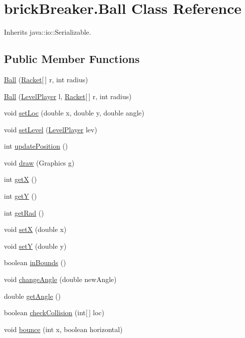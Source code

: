 \hypertarget{classbrick_breaker_1_1_ball}{
\section{brickBreaker.Ball Class Reference}
\label{classbrick_breaker_1_1_ball}
}


Inherits java::io::Serializable.

\subsection*{Public Member Functions}
\begin{DoxyCompactItemize}
\item 
\hyperlink{classbrick_breaker_1_1_ball_acb18370d945b133d9c3a3d87beca7e4c}{Ball} (\hyperlink{classbrick_breaker_1_1_racket}{Racket}\mbox{[}$\,$\mbox{]} r, int radius)
\item 
\hyperlink{classbrick_breaker_1_1_ball_ae797eeb30e776dbe48357107816db887}{Ball} (\hyperlink{classbrick_breaker_1_1_level_player}{LevelPlayer} l, \hyperlink{classbrick_breaker_1_1_racket}{Racket}\mbox{[}$\,$\mbox{]} r, int radius)
\item 
void \hyperlink{classbrick_breaker_1_1_ball_adcc8436d899828fe7f3c788ed1daf8d6}{setLoc} (double x, double y, double angle)
\item 
void \hyperlink{classbrick_breaker_1_1_ball_a3a95a5d7eeab58dbacd89d1e304bf2d4}{setLevel} (\hyperlink{classbrick_breaker_1_1_level_player}{LevelPlayer} lev)
\item 
int \hyperlink{classbrick_breaker_1_1_ball_a7c119360e2434ef5c69020e8608569ff}{updatePosition} ()
\item 
void \hyperlink{classbrick_breaker_1_1_ball_ab2ed912dfac55974d85184840fd8be9d}{draw} (Graphics g)
\item 
int \hyperlink{classbrick_breaker_1_1_ball_af0651b3d0294b6843a7a5b74acb87195}{getX} ()
\item 
int \hyperlink{classbrick_breaker_1_1_ball_abc92d446c039bfae85f89ba82facdfc3}{getY} ()
\item 
int \hyperlink{classbrick_breaker_1_1_ball_ae4ca4fc89a298a422b96c3056e9b9d1a}{getRad} ()
\item 
void \hyperlink{classbrick_breaker_1_1_ball_a71e24748f9cb90bd9da6a910648ba84e}{setX} (double x)
\item 
void \hyperlink{classbrick_breaker_1_1_ball_ae15aedc6cd01476f486328369fd6a799}{setY} (double y)
\item 
boolean \hyperlink{classbrick_breaker_1_1_ball_ac516403ca5285c41619248f6c1e0690b}{inBounds} ()
\item 
void \hyperlink{classbrick_breaker_1_1_ball_a443ce0341305785eaf4da97d755bb550}{changeAngle} (double newAngle)
\item 
double \hyperlink{classbrick_breaker_1_1_ball_a022f1feac935da4a1480fc70f56858d4}{getAngle} ()
\item 
boolean \hyperlink{classbrick_breaker_1_1_ball_aff35873f2550b5b0601cfb7b31cfc368}{checkCollision} (int\mbox{[}$\,$\mbox{]} loc)
\item 
void \hyperlink{classbrick_breaker_1_1_ball_a102b54397819a72161278ccfeb1f5d72}{bounce} (int x, boolean horizontal)
\end{DoxyCompactItemize}
